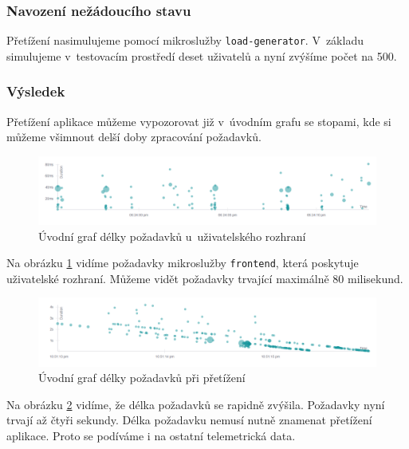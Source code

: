 \subsubsection{Navození nežádoucího stavu}

Přetížení nasimulujeme pomocí mikroslužby \texttt{load-generator}. V~základu simulujeme v~testovacím prostředí deset uživatelů a nyní zvýšíme počet na 500. 

\subsubsection{Výsledek}

Přetížení aplikace můžeme vypozorovat již v~úvodním grafu se stopami, kde si můžeme všimnout delší doby zpracování požadavků.

\begin{figure}[H]
  \centering
  \includegraphics[width=15cm]{obrazky-figures/frontend-normal-graf.png}
  \caption{Úvodní graf délky požadavků u~uživatelského rozhraní}
  \label{fig:jeagerFrontendNormal}
\end{figure}

Na obrázku \ref{fig:jeagerFrontendNormal} vidíme požadavky mikroslužby \texttt{frontend}, která poskytuje uživatelské rozhraní. Můžeme vidět požadavky trvající maximálně 80 milisekund.


\begin{figure}[H]
  \centering
  \includegraphics[width=15cm]{obrazky-figures/frontend_graf_users.png}
  \caption{Úvodní graf délky požadavků při přetížení}
  \label{fig:jeagerFrontendUsers}
\end{figure}

Na obrázku \ref{fig:jeagerFrontendUsers} vidíme, že délka požadavků se rapidně zvýšila. Požadavky nyní trvají až čtyři sekundy. Délka požadavku nemusí nutně znamenat přetížení aplikace. Proto se podíváme i na ostatní telemetrická data.


